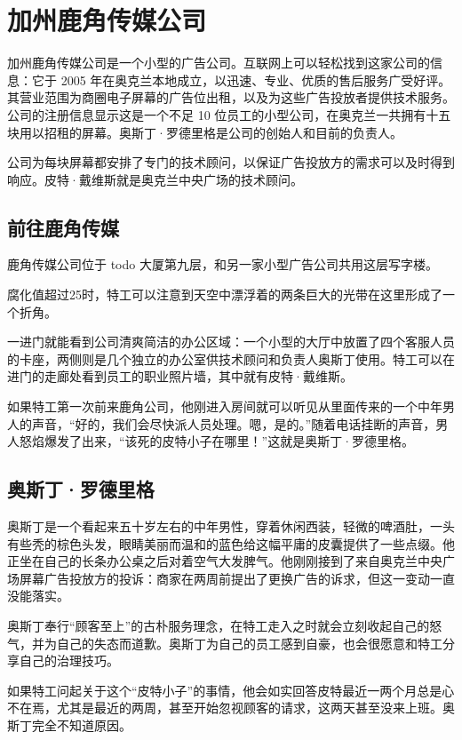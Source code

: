 
\section{加州鹿角传媒公司}
加州鹿角传媒公司是一个小型的广告公司。互联网上可以轻松找到这家公司的信息：它于 2005 年在奥克兰本地成立，以迅速、专业、优质的售后服务广受好评。其营业范围为商圈电子屏幕的广告位出租，以及为这些广告投放者提供技术服务。公司的注册信息显示这是一个不足 10 位员工的小型公司，在奥克兰一共拥有十五块用以招租的屏幕。奥斯丁·罗德里格是公司的创始人和目前的负责人。

公司为每块屏幕都安排了专门的技术顾问，以保证广告投放方的需求可以及时得到响应。皮特·戴维斯就是奥克兰中央广场的技术顾问。

\subsection{前往鹿角传媒}

鹿角传媒公司位于 todo 大厦第九层，和另一家小型广告公司共用这层写字楼。

腐化值超过25时，特工可以注意到天空中漂浮着的两条巨大的光带在这里形成了一个折角。

一进门就能看到公司清爽简洁的办公区域：一个小型的大厅中放置了四个客服人员的卡座，两侧则是几个独立的办公室供技术顾问和负责人奥斯丁使用。特工可以在进门的走廊处看到员工的职业照片墙，其中就有皮特·戴维斯。

如果特工第一次前来鹿角公司，他刚进入房间就可以听见从里面传来的一个中年男人的声音，“好的，我们会尽快派人员处理。嗯，是的。”随着电话挂断的声音，男人怒焰爆发了出来，“该死的皮特小子在哪里！”这就是奥斯丁·罗德里格。

\subsection{奥斯丁·罗德里格}

奥斯丁是一个看起来五十岁左右的中年男性，穿着休闲西装，轻微的啤酒肚，一头有些秃的棕色头发，眼睛美丽而温和的蓝色给这幅平庸的皮囊提供了一些点缀。他正坐在自己的长条办公桌之后对着空气大发脾气。他刚刚接到了来自奥克兰中央广场屏幕广告投放方的投诉：商家在两周前提出了更换广告的诉求，但这一变动一直没能落实。

奥斯丁奉行“顾客至上”的古朴服务理念，在特工走入之时就会立刻收起自己的怒气，并为自己的失态而道歉。奥斯丁为自己的员工感到自豪，也会很愿意和特工分享自己的治理技巧。

如果特工问起关于这个“皮特小子”的事情，他会如实回答皮特最近一两个月总是心不在焉，尤其是最近的两周，甚至开始忽视顾客的请求，这两天甚至没来上班。奥斯丁完全不知道原因。

